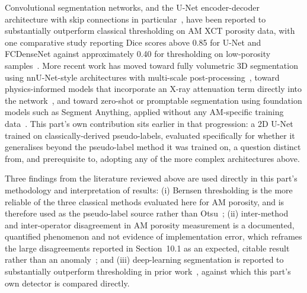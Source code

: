 Convolutional segmentation networks, and the U-Net encoder-decoder architecture with skip
connections in particular~\citep{Ronneberger2015}, have been reported to substantially outperform
classical thresholding on AM XCT porosity data, with one comparative study reporting Dice scores
above 0.85 for U-Net and FCDenseNet against approximately 0.40 for thresholding on low-porosity
samples~\citep{Wong2022}. More recent work has moved toward fully volumetric 3D segmentation using
nnU-Net-style architectures with multi-scale post-processing~\citep{ScienceDirect2026}, toward
physics-informed models that incorporate an X-ray attenuation term directly into the
network~\citep{Arxiv2024}, and toward zero-shot or promptable segmentation using foundation models
such as Segment Anything, applied without any AM-specific training data~\citep{npj2025}. This part's
own contribution sits earlier in that progression: a 2D U-Net trained on classically-derived
pseudo-labels, evaluated specifically for whether it generalises beyond the pseudo-label method it
was trained on, a question distinct from, and prerequisite to, adopting any of the more complex
architectures above.

Three findings from the literature reviewed above are used directly in this part's methodology and
interpretation of results: (i) Bernsen thresholding is the more reliable of the three classical
methods evaluated here for AM porosity, and is therefore used as the pseudo-label source rather than
Otsu~\citep{Kim2017}; (ii) inter-method and inter-operator disagreement in AM porosity measurement is
a documented, quantified phenomenon and not evidence of implementation error, which reframes the
large disagreements reported in Section~10.1 as an expected, citable result rather than an
anomaly~\citep{AppliedSciences2025}; and (iii) deep-learning segmentation is reported to
substantially outperform thresholding in prior work~\citep{Wong2022}, against which this part's own
detector is compared directly.
